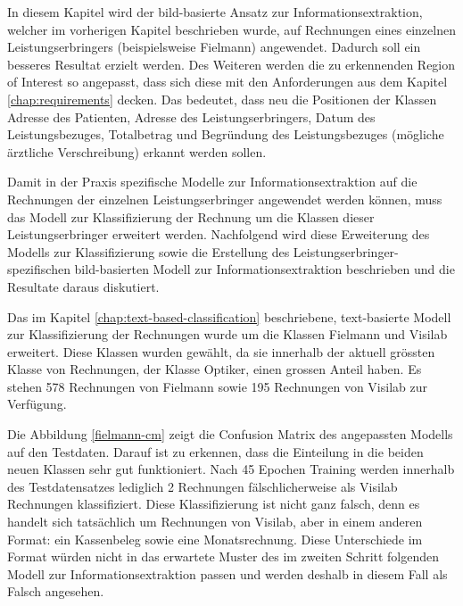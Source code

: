 In diesem Kapitel wird der bild-basierte Ansatz zur Informationsextraktion, welcher im vorherigen Kapitel beschrieben wurde, auf Rechnungen eines einzelnen Leistungserbringers (beispielsweise Fielmann) angewendet. Dadurch soll ein besseres Resultat erzielt werden. Des Weiteren werden die zu erkennenden Region of Interest so angepasst, dass sich diese mit den Anforderungen aus dem Kapitel \ref{chap:requirements} decken. Das bedeutet, dass neu die Positionen der Klassen Adresse des Patienten, Adresse des Leistungserbringers, Datum des Leistungsbezuges, Totalbetrag und Begründung des Leistungsbezuges (mögliche ärztliche Verschreibung) erkannt werden sollen.

Damit in der Praxis spezifische Modelle zur Informationsextraktion auf die Rechnungen der einzelnen Leistungserbringer angewendet werden können, muss das Modell zur Klassifizierung der Rechnung um die Klassen dieser Leistungserbringer erweitert werden. Nachfolgend wird diese Erweiterung des Modells zur Klassifizierung sowie die Erstellung des Leistungserbringer-spezifischen bild-basierten Modell zur Informationsextraktion beschrieben und die Resultate daraus diskutiert.

Das im Kapitel \ref{chap:text-based-classification} beschriebene, text-basierte Modell zur Klassifizierung der Rechnungen wurde um die Klassen Fielmann und Visilab erweitert. Diese Klassen wurden gewählt, da sie innerhalb der aktuell grössten Klasse von Rechnungen, der Klasse Optiker, einen grossen Anteil haben. Es stehen 578 Rechnungen von Fielmann sowie 195 Rechnungen von Visilab zur Verfügung.

Die Abbildung \ref{fielmann-cm} zeigt die Confusion Matrix des angepassten Modells auf den Testdaten. Darauf ist zu erkennen, dass die Einteilung in die beiden neuen Klassen sehr gut funktioniert. Nach 45 Epochen Training werden innerhalb des Testdatensatzes lediglich 2 Rechnungen fälschlicherweise als Visilab Rechnungen klassifiziert. Diese Klassifizierung ist nicht ganz falsch, denn es handelt sich tatsächlich um Rechnungen von Visilab, aber in einem anderen Format: ein Kassenbeleg sowie eine Monatsrechnung. Diese Unterschiede im Format würden nicht in das erwartete Muster des im zweiten Schritt folgenden Modell zur Informationsextraktion passen und werden deshalb in diesem Fall als Falsch angesehen.

